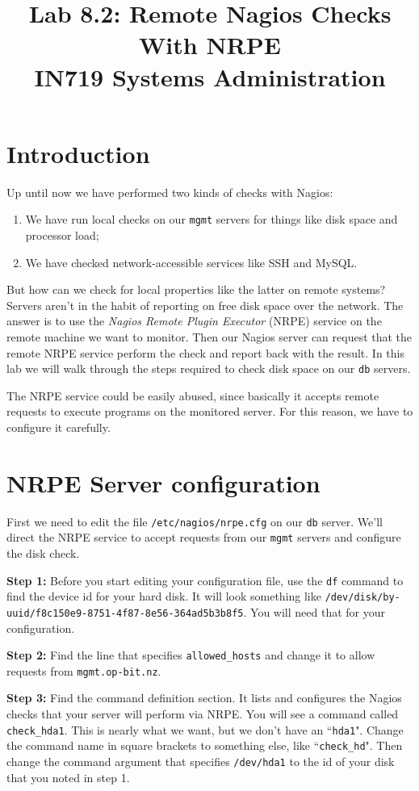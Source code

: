\documentclass{article}   	%
\title{Lab 8.2:  Remote Nagios Checks With NRPE\\ IN719 Systems Administration}
\date{}							%
\begin{document}
\maketitle

\section*{Introduction}
Up until now we have performed two kinds of checks with Nagios:

\begin{enumerate}
  \item We have run local checks on our \texttt{mgmt} servers for things like disk space and processor load;
  \item We have checked network-accessible services like SSH and MySQL.
\end{enumerate}

But how can we check for local properties like the latter on remote systems?  Servers aren't in the habit of reporting on free disk space over the network.  The answer is to use the \emph{Nagios Remote Plugin Executor} (NRPE) service on the remote machine we want to monitor.  Then our Nagios server can request that the remote NRPE service perform the check and report back with the result.  In this lab we will walk through the steps required to check disk space on our \texttt{db} servers.

The NRPE service could be easily abused, since basically it accepts remote requests to execute programs on the monitored server.  For this reason, we have to configure it carefully.

\section{NRPE Server configuration}
First we need to edit the file \texttt{/etc/nagios/nrpe.cfg} on our \texttt{db} server.  We'll direct the NRPE service to accept requests from our \texttt{mgmt} servers and configure the disk check.

\textbf{Step 1:} Before you start editing your configuration file, use the \texttt{df} command to find the device id for your hard disk.  It will look something like \texttt{/dev/disk/by-uuid/f8c150e9-8751-4f87-8e56-364ad5b3b8f5}.  You will need that for your configuration.

\textbf{Step 2:} Find the line that specifies \texttt{allowed\_hosts} and change it to allow requests from \texttt{mgmt.op-bit.nz}.

\textbf{Step 3:} Find the command definition section.  It lists and configures the Nagios checks that your server will perform via NRPE.  You will see a command called \texttt{check\_hda1}.  This is nearly what we want, but we don't have an ``\texttt{hda1}".  Change the command name in square brackets to something else, like ``\texttt{check\_hd}".  Then change the command argument that specifies \texttt{/dev/hda1} to the id of your disk that you noted in step 1.
\end{document}
